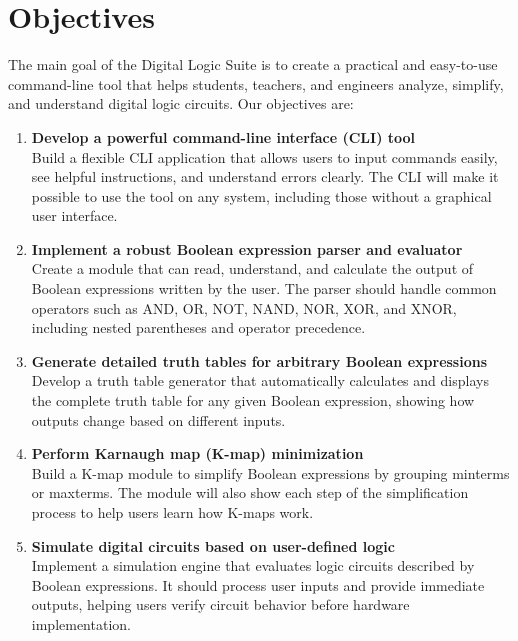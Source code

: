 \section{Objectives}

The main goal of the Digital Logic Suite is to create a practical and easy-to-use command-line tool that helps students, teachers, and engineers analyze, simplify, and understand digital logic circuits. Our objectives are:

\begin{enumerate}
  \item \textbf{Develop a powerful command-line interface (CLI) tool} \\
        Build a flexible CLI application that allows users to input commands easily, see helpful instructions, and understand errors clearly. The CLI will make it possible to use the tool on any system, including those without a graphical user interface.

  \item \textbf{Implement a robust Boolean expression parser and evaluator} \\
        Create a module that can read, understand, and calculate the output of Boolean expressions written by the user. The parser should handle common operators such as AND, OR, NOT, NAND, NOR, XOR, and XNOR, including nested parentheses and operator precedence.

  \item \textbf{Generate detailed truth tables for arbitrary Boolean expressions} \\
        Develop a truth table generator that automatically calculates and displays the complete truth table for any given Boolean expression, showing how outputs change based on different inputs.

  \item \textbf{Perform Karnaugh map (K-map) minimization} \\
        Build a K-map module to simplify Boolean expressions by grouping minterms or maxterms. The module will also show each step of the simplification process to help users learn how K-maps work.

  \item \textbf{Simulate digital circuits based on user-defined logic} \\
        Implement a simulation engine that evaluates logic circuits described by Boolean expressions. It should process user inputs and provide immediate outputs, helping users verify circuit behavior before hardware implementation.


\end{enumerate}
